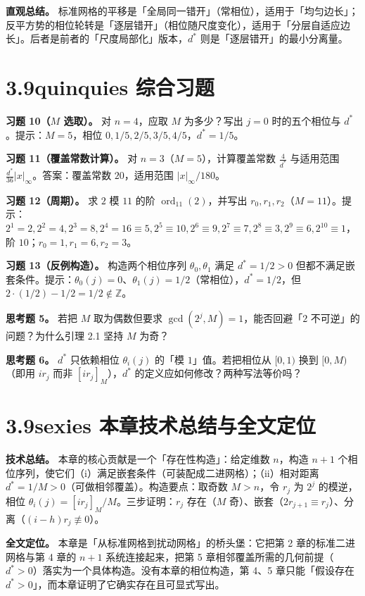 \documentclass[a4paper,11pt,openany]{ctexbook}
\numberwithin{equation}{chapter}
\numberwithin{figure}{chapter}
\numberwithin{table}{chapter}
\begin{document}
\textbf{直观总结。} 标准网格的平移是「全局同一错开」（常相位），适用于「均匀边长」；反平方势的相位轮转是「逐层错开」（相位随尺度变化），适用于「分层自适应边长」。后者是前者的「尺度局部化」版本，$d^*$ 则是「逐层错开」的最小分离量。

\section{3.9quinquies 综合习题}

\textbf{习题 10（$M$ 选取）。} 对 $n=4$，应取 $M$ 为多少？写出 $j=0$ 时的五个相位与 $d^*$。提示：$M=5$，相位 $0,1/5,2/5,3/5,4/5$，$d^*=1/5$。

\textbf{习题 11（覆盖常数计算）。} 对 $n=3$（$M=5$），计算覆盖常数 $\frac4{d^*}$ 与适用范围 $\frac{d^*}{36}|x|_\infty$。答案：覆盖常数 $20$，适用范围 $|x|_\infty/180$。

\textbf{习题 12（周期）。} 求 $2$ 模 $11$ 的阶 $\operatorname{ord}_{11}(2)$，并写出 $r_0,r_1,r_2$（$M=11$）。提示：$2^1=2,2^2=4,2^3=8,2^4=16\equiv5,2^5\equiv10,2^6\equiv9,2^7\equiv7,2^8\equiv3,2^9\equiv6,2^{10}\equiv1$，阶 $10$；$r_0=1,r_1=6,r_2=3$。

\textbf{习题 13（反例构造）。} 构造两个相位序列 $\theta_0,\theta_1$ 满足 $d^*=1/2>0$ 但都不满足嵌套条件。提示：$\theta_0(j)=0$、$\theta_1(j)=1/2$（常相位），$d^*=1/2$，但 $2\cdot(1/2)-1/2=1/2\notin\mathbb Z$。

\textbf{思考题 5。} 若把 $M$ 取为偶数但要求 $\gcd(2^j,M)=1$，能否回避「$2$ 不可逆」的问题？为什么引理 2.1 坚持 $M$ 为奇？

\textbf{思考题 6。} $d^*$ 只依赖相位 $\theta_i(j)$ 的「模 $1$」值。若把相位从 $[0,1)$ 换到 $[0,M)$（即用 $ir_j$ 而非 $[ir_j]_M$），$d^*$ 的定义应如何修改？两种写法等价吗？

\section{3.9sexies 本章技术总结与全文定位}

\textbf{技术总结。} 本章的核心贡献是一个「存在性构造」：给定维数 $n$，构造 $n+1$ 个相位序列，使它们（i）满足嵌套条件（可装配成二进网格）；（ii）相对距离 $d^*=1/M>0$（可做相邻覆盖）。构造要点：取奇数 $M>n$，令 $r_j$ 为 $2^j$ 的模逆，相位 $\theta_i(j)=[ir_j]_M/M$。三步证明：$r_j$ 存在（$M$ 奇）、嵌套（$2r_{j+1}\equiv r_j$）、分离（$(i-h)r_j\not\equiv0$）。

\textbf{全文定位。} 本章是「从标准网格到扰动网格」的桥头堡：它把第 2 章的标准二进网格与第 4 章的 $n+1$ 系统连接起来，把第 5 章相邻覆盖所需的几何前提（$d^*>0$）落实为一个具体构造。没有本章的相位构造，第 4、5 章只能「假设存在 $d^*>0$」，而本章证明了它确实存在且可显式写出。
\end{document}
